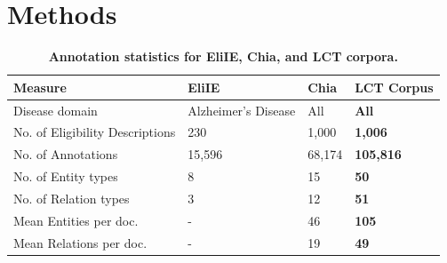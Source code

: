 \documentclass[fleqn,10pt]{wlscirep}
\begin{document}
\section*{Methods}
\label{sec:methods}
\begin{table}
\centering
\begin{tabular}{l|lll} 
 \toprule
 Measure & EliIE \cite{kang2017eliie} & Chia \cite{kury2020chia} & \textbf{LCT Corpus} \\
 \hline
    Disease domain & Alzheimer's Disease & All & \textbf{All} \\
    No. of Eligibility Descriptions & 230 & 1,000 & \textbf{1,006} \\
    No. of Annotations & 15,596 & 68,174 & \textbf{105,816} \\
    No. of Entity types & 8 & 15 & \textbf{50} \\
    No. of Relation types & 3 & 12 & \textbf{51} \\
    Mean Entities per doc. & - & 46 & \textbf{105} \\
    Mean Relations per doc. & - & 19 & \textbf{49} \\
 \hline
\end{tabular}
\caption{\textbf{Annotation statistics for EliIE, Chia, and LCT corpora.}}
\label{tbl_corpora_compare}
\end{table}
\end{document}
